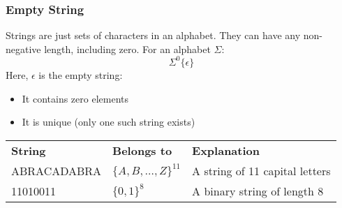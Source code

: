 \documentclass[10pt]{article}
\begin{document}
\subsubsection*{Empty String}
Strings are just sets of characters in an alphabet.  They can have any non-negative length, including zero.  For an alphabet $\Sigma$:
\[\Sigma^0 \{\epsilon\}\]
Here, $\epsilon$ is the empty string:
\begin{itemize}
	\item It contains zero elements
	\item It is unique (only one such string exists)
\end{itemize}
\begin{center}
    \begin{tabularx}{\textwidth}{XXX}
    \textbf{String} & \textbf{Belongs to} & \textbf{Explanation} \\
    ABRACADABRA & $\{A, B, \dots, Z\}^{11}$ & A string of 11 capital letters \\
    11010011 & $\{0, 1\}^8$ & A binary string of length 8
    \end{tabularx}
\end{center}
\end{document}
